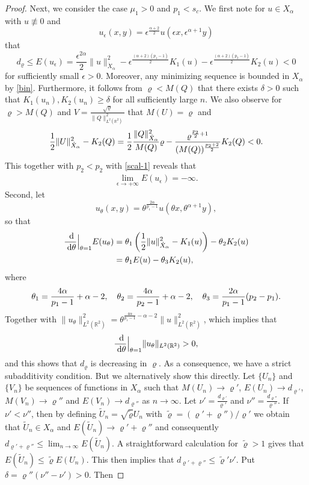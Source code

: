 \documentclass[10pt]{article}
\numberwithin{equation}{section}
\newcommand{\lt}{{L^2(\mathbb{R}^2)}}
\newcommand{\dd}{\;{\rm d}}
\newcommand{\xx}{{\dot{X}_\alpha}}
\newcommand{\mo}{\mu_1}  \newcommand{\po}{{p_1}}
\newcommand{\vr}{{\varrho}}
\newcommand{\al}{\alpha}
\begin{document}
\begin{proof}
		
		Next, we consider the case $\mo>0$ and $p_1<s_c$. We first note for $u\in X_\al$ with $u\not\equiv0$ and
		\begin{equation}\label{scal-1}
			u_\epsilon(x,y)=\epsilon^{\frac{\al+2}{2}}u(\epsilon x,\epsilon^{\al+1}y) 
		\end{equation}
		that
		\[
		d_\varrho\leq E(u_\epsilon)
		=\frac{\epsilon^{2\al}}{2}\|u\|_\xx^2-\epsilon^{\frac{(\al+2)(p_1-1)}{2}}K_1(u)-\epsilon^{\frac{(\al+2)(p_2-1)}{2}}K_2(u)<0
		\]
		for sufficiently small $\epsilon>0$. Moreover, any minimizing sequence is bounded in $X_\al$ by \eqref{bin}. Furthermore, it follows from  $\vr<M(Q)$ that there exists $\delta>0$ such that $K_1(u_n),K_2(u_n)\geq \delta$ for all sufficiently large $n$. We also observe for $\varrho>M(Q)$ and $V=\frac{\sqrt\varrho}{\|Q\|_\lt^2}$ that $M(U)=\varrho$ and
		\[
		\frac12\|U\|_\xx^2-K_2(Q)=\frac12\frac{\|Q\|_\xx ^2}{M(Q)}\varrho -\frac{\varrho^{\frac{\poo}{2}+1}}{(M(Q))^{\frac{\poo+2}{2}}}K_2(Q)<0.
		\]
		This together with $p_2<p_2$ with \eqref{scal-1} reveals that
		\[
		\begin{split}
			\lim_{\epsilon\to+\infty}	E(u_\epsilon)=-\infty.
		\end{split}
		\]
		Second,  let 
		\[
		u_\theta(x,y)=\theta^{\frac{2\al}{\po-1}}u(\theta x,\theta^{\al+1}y),
		\]
		so that
		\[
		\begin{split}
			{\frac{\dd}{\dd\theta}}\Big|_{\theta=1}E(u_\theta)&=
			\theta_1\left(\frac12\|u\|_\xx^2-K_1(u)\right)-\theta_2K_2(u)\\
			&=\theta_1 E(u)-\theta_3K_2(u),
		\end{split}
		\]
		where
		\[
		\theta_1=\frac{4\al}{\po-1}+\al-2,\quad\theta_2=\frac{4\al}{\poo-1}+\al-2,
		\quad
		\theta_3=\frac{2\al}{\po-1}(\poo-\po).
		\]
		Together with $\|u_\theta\|_\lt^2=\theta^{\frac{4\al}{\po-1}-\al-2}\|u\|_\lt^2$, which implies that 
		\[
		{\frac{\dd}{\dd\theta}}\Big|_{\theta=1}\|u_\theta\|_\lt>0,
		\]
		and this shows that $d_\varrho$ is decreasing in $\varrho$. As a consequence, we have a strict subadditivity condition. But we alternatively show this directly.
		Let $\{U_n\}$ and $\{V_n\}$ be sequences of functions in $X_\al$ such that $M(U_n)\to\vr'$, $E(U_n)\to d_{\vr'}$, $M(V_n)\to\vr''$  and $E(V_n)\to d_{\vr''}$ as $n\to\infty$. Let $\nu'=\frac{d_{\vr'}}{\vr'}$  and $\nu''=\frac{d_{\vr''}}{\vr''}$. If $\nu'<\nu''$, then by defining $\tilde U_n=\sqrt{\tilde\vr} U_n$ with $\tilde\vr=(\vr'+\vr'')/\vr'$ we obtain that $\tilde U_n\in X_\al$ and $E(\tilde U_n)\to\vr'+\vr''$ and consequently $d_{\vr'+\vr''}\leq\lim_{n\to\infty}E(\tilde U_n)$. A straightforward calculation for $\tilde\vr>1$ gives that $E(\tilde U_n)\leq\tilde\vr E(U_n)$. This then implies that $d_{\vr'+\vr''}\leq \tilde\vr'\nu'.$ Put $\delta=\vr''(\nu''-\nu')>0$. Then

\end{proof}
\end{document}
